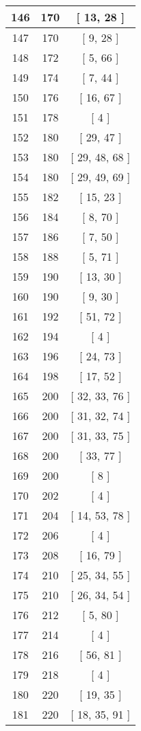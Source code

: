 \begin{center}
\begin{longtable}[H]{|| c c c ||}
\hline
146 & 170 & [ 13, 28 ] \\ 
\hline
147 & 170 & [ 9, 28 ] \\ 
\hline
148 & 172 & [ 5, 66 ] \\ 
\hline
149 & 174 & [ 7, 44 ] \\ 
\hline
150 & 176 & [ 16, 67 ] \\ 
\hline
151 & 178 & [ 4 ] \\ 
\hline
152 & 180 & [ 29, 47 ] \\ 
\hline
153 & 180 & [ 29, 48, 68 ] \\ 
\hline
154 & 180 & [ 29, 49, 69 ] \\ 
\hline
155 & 182 & [ 15, 23 ] \\ 
\hline
156 & 184 & [ 8, 70 ] \\ 
\hline
157 & 186 & [ 7, 50 ] \\ 
\hline
158 & 188 & [ 5, 71 ] \\ 
\hline
159 & 190 & [ 13, 30 ] \\ 
\hline
160 & 190 & [ 9, 30 ] \\ 
\hline
161 & 192 & [ 51, 72 ] \\ 
\hline
162 & 194 & [ 4 ] \\ 
\hline
163 & 196 & [ 24, 73 ] \\ 
\hline
164 & 198 & [ 17, 52 ] \\ 
\hline
165 & 200 & [ 32, 33, 76 ] \\ 
\hline
166 & 200 & [ 31, 32, 74 ] \\ 
\hline
167 & 200 & [ 31, 33, 75 ] \\ 
\hline
168 & 200 & [ 33, 77 ] \\ 
\hline
169 & 200 & [ 8 ] \\ 
\hline
170 & 202 & [ 4 ] \\ 
\hline
171 & 204 & [ 14, 53, 78 ] \\ 
\hline
172 & 206 & [ 4 ] \\ 
\hline
173 & 208 & [ 16, 79 ] \\ 
\hline
174 & 210 & [ 25, 34, 55 ] \\ 
\hline
175 & 210 & [ 26, 34, 54 ] \\ 
\hline
176 & 212 & [ 5, 80 ] \\ 
\hline
177 & 214 & [ 4 ] \\ 
\hline
178 & 216 & [ 56, 81 ] \\ 
\hline
179 & 218 & [ 4 ] \\ 
\hline
180 & 220 & [ 19, 35 ] \\ 
\hline
181 & 220 & [ 18, 35, 91 ] \\ 

\end{longtable}
\end{center}
